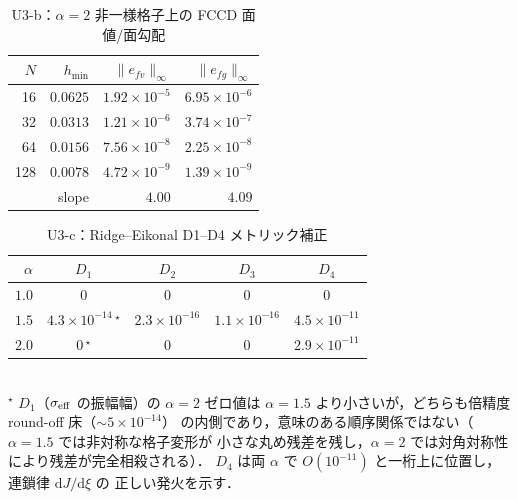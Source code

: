\begin{table}[!ht]
\caption{U3-b：\texorpdfstring{$\alpha=2$}{alpha=2} 非一様格子上の FCCD 面値/面勾配}
\label{tab:U3_fccd_nonuniform}
\centering\small
\begin{tabular}{r r r r}
\toprule
$N$ & $h_{\min}$ & $\|e_{fv}\|_\infty$ & $\|e_{fg}\|_\infty$ \\
\midrule
16  & $0.0625$  & $1.92\times 10^{-5}$ & $6.95\times 10^{-6}$ \\
32  & $0.0313$  & $1.21\times 10^{-6}$ & $3.74\times 10^{-7}$ \\
64  & $0.0156$  & $7.56\times 10^{-8}$ & $2.25\times 10^{-8}$ \\
128 & $0.0078$  & $4.72\times 10^{-9}$ & $1.39\times 10^{-9}$ \\
\midrule
\multicolumn{2}{r}{slope} & $\mathbf{4.00}$ & $\mathbf{4.09}$ \\
\bottomrule
\end{tabular}
\end{table}

\begin{table}[!ht]
\caption{U3-c：Ridge--Eikonal D1--D4 メトリック補正}
\label{tab:U3_ridge_metrics}
\centering\small
\begin{tabular}{r c c c c}
\toprule
$\alpha$ & $D_1$ & $D_2$ & $D_3$ & $D_4$ \\
\midrule
$1.0$ & $0$ & $0$ & $0$ & $0$ \\
$1.5$ & $4.3\times 10^{-14}\,^\star$ & $2.3\times 10^{-16}$ & $1.1\times 10^{-16}$ & $4.5\times 10^{-11}$ \\
$2.0$ & $0\,^\star$ & $0$ & $0$ & $2.9\times 10^{-11}$ \\
\bottomrule
\end{tabular}
\\[2pt]
{\footnotesize $^\star$ $D_1$（$\sigma_{\mathrm{eff}}$ の振幅幅）の $\alpha\!=\!2$ ゼロ値は
$\alpha\!=\!1.5$ より小さいが，どちらも倍精度 round-off 床（$\sim 5\!\times\!10^{-14}$）
の内側であり，意味のある順序関係ではない（$\alpha\!=\!1.5$ では非対称な格子変形が
小さな丸め残差を残し，$\alpha\!=\!2$ では対角対称性により残差が完全相殺される）．
$D_4$ は両 $\alpha$ で $O(10^{-11})$ と一桁上に位置し，連鎖律 $\mathrm{d}J/\mathrm{d}\xi$ の
正しい発火を示す．}
\end{table}


